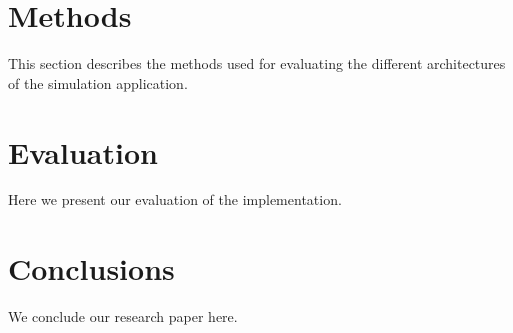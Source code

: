 \documentclass[conference]{IEEEtran}
\begin{document}
\section{Methods}
\label{sec:methods}

This section describes the methods used for evaluating the different architectures of the simulation application.

\section{Evaluation}
\label{sec:sec2}

Here we present our evaluation of the implementation.

\section{Conclusions}
\label{sec:conc}

We conclude our research paper here.

\printbibliography[title={References}]
\end{document}

